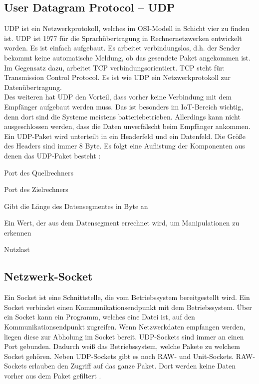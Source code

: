 \subsection{User Datagram Protocol -- UDP}
UDP ist ein Netzwerkprotokoll, welches im OSI-Modell in Schicht vier zu finden ist. UDP ist 1977 für die Sprachübertragung in Rechnernetzwerken entwickelt worden. Es ist einfach aufgebaut. Es arbeitet verbindungslos, d.h. der Sender bekommt keine automatische Meldung, ob das gesendete Paket angekommen ist. Im Gegensatz dazu, arbeitet TCP verbindungsorientiert. TCP steht für: Transmission Control Protocol. Es ist wie UDP ein Netzwerkprotokoll zur Datenübertragung.
\\
Des weiteren hat UDP den Vorteil, dass vorher keine Verbindung mit dem Empfänger aufgebaut werden muss. Das ist besonders im IoT-Bereich wichtig, denn dort sind die Systeme meistens batteriebetrieben. Allerdings kann nicht ausgeschlossen werden, dass die Daten unverfälscht beim Empfänger ankommen.
\\
Ein UDP-Paket wird unterteilt in ein Headerfeld und ein Datenfeld. Die Größe des Headers sind immer 8 Byte. Es folgt eine Auflistung der Komponenten aus denen das UDP-Paket besteht \cite{src_UDP}:
\\
\begin{description}[style=multiline,leftmargin=3cm]
\item [Quellport] 	Port des Quellrechners
\item [Zielport]  	Port des Zielrechners
\item [Länge]		Gibt die Länge des Datensegmentes in Byte an
\item [Prüfsumme]	Ein Wert, der aus dem Datensegment errechnet wird, um Manipulationen zu erkennen
\item [Daten]		Nutzlast
\end{description}

\subsection{Netzwerk-Socket}
Ein Socket ist eine Schnittstelle, die vom Betriebssystem bereitgestellt wird. Ein Socket verbindet einen Kommunikationsendpunkt mit dem Betriebssystem. Über ein Socket kann ein Programm, welches eine Datei ist, auf den Kommunikationsendpunkt zugreifen. Wenn Netzwerkdaten empfangen werden, liegen diese zur Abholung im Socket bereit. 
UDP-Sockets sind immer an einen Port gebunden. Dadurch weiß das Betriebssystem, welche Pakete zu welchem Socket gehören. Neben UDP-Sockets gibt es noch RAW- und Unit-Sockets. RAW-Sockets erlauben den Zugriff auf das ganze Paket. Dort werden keine Daten vorher aus dem Paket gefiltert \cite{src_SOCKET}.

